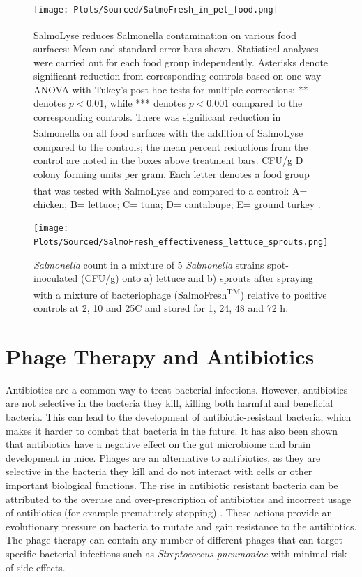 \begin{figure}[ht!]
    \centering
    \texttt{[image: Plots/Sourced/SalmoFresh\_in\_pet\_food.png]}
    \caption{SalmoLyse\textsuperscript{\textregistered} reduces Salmonella contamination on various food surfaces: Mean and standard error bars shown.
        Statistical analyses were carried out for each food group independently.
        Asterisks denote significant reduction from corresponding controls based on one-way ANOVA with Tukey's post-hoc tests for multiple corrections: ** denotes $p < 0.01$, while *** denotes $p < 0.001$ compared to the corresponding controls.
        There was significant reduction in Salmonella on all food surfaces with the addition of SalmoLyse\textsuperscript{\textregistered} compared to the controls; the mean percent reductions from the control are noted in the boxes above treatment bars.
        CFU/g D colony forming units per gram.
        Each letter denotes a food group that was tested with SalmoLyse\textsuperscript{\textregistered} and compared to a control: A= chicken; B= lettuce; C= tuna; D= cantaloupe; E= ground turkey \cite{sofferBacteriophagesSafelyReduce2016}. 
    }
    \label{fig:SalmoFresh_pet_food}
\end{figure}

\begin{figure}[ht!]
    \centering
    \texttt{[image: Plots/Sourced/SalmoFresh\_effectiveness\_lettuce\_sprouts.png]}
    \caption{\textit{Salmonella} count in a mixture of 5 \textit{Salmonella} strains spot-inoculated (CFU/g) onto a) lettuce and b) sprouts after spraying with a mixture of bacteriophage (SalmoFresh\textsuperscript{TM}) relative to positive controls at 2, 10 and 25C and stored for 1, 24, 48 and 72 h. \cite{zhangSalmoFreshEffectivenessControlling2019}}
    \label{fig:SalmoFresh_lettuce}
\end{figure}


\section{Phage Therapy and Antibiotics}
Antibiotics are a common way to treat bacterial infections.
However, antibiotics are not selective in the bacteria they kill, killing both harmful and beneficial bacteria.
This can lead to the development of antibiotic-resistant bacteria, which makes it harder to combat that bacteria in the future.
It has also been shown that antibiotics have a negative effect on the gut microbiome and brain development in mice.
Phages are an alternative to antibiotics, as they are selective in the bacteria they kill and do not interact with cells or other important biological functions.
The rise in antibiotic resistant bacteria can be attributed to the overuse and over-prescription of antibiotics and incorrect usage of antibiotics (for example prematurely stopping) \cite{odonkorBacteriaResistanceAntibiotics2011}.
These actions provide an evolutionary pressure on bacteria to mutate and gain resistance to the antibiotics. 
The phage therapy can contain any number of different phages that can target specific bacterial infections such as \textit{Streptococcus pneumoniae} with minimal risk of side effects.

